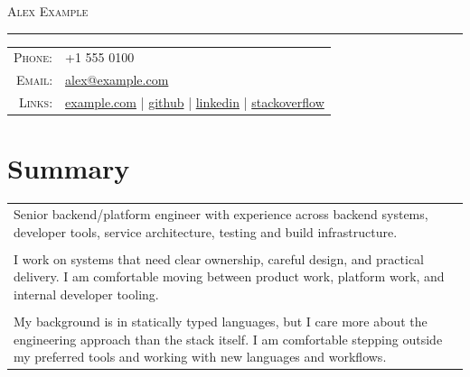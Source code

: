 \documentclass[a4paper,11pt]{article}
\begin{document}
\par{\centering
		{\Huge \textsc{Alex Example}
	}\bigskip\par}

\hrule
\vspace{0.5em}
\begin{tabular}{rl}
  \textsc{Phone:}     & +1 555 0100\\
  \textsc{Email:}     & \href{mailto:alex@example.com}{alex@example.com}\\
  \textsc{Links:}     & \faHome{} \href{https://example.com}{example.com}
                      | \faGithub{} \href{https://github.com/example}{github}
                      | \faLinkedin{} \href{https://www.linkedin.com/in/example/}{linkedin}
                      | \faStackOverflow{} \href{https://stackoverflow.com/users/000000/example}{stackoverflow}
\end{tabular}

\section{Summary}
\begin{tabular}{p{}}
 Senior backend/platform engineer with experience across backend systems, developer tools, service architecture, testing and build infrastructure.\\\\

 I work on systems that need clear ownership, careful design, and practical delivery. I am comfortable moving between product work, platform work, and internal developer tooling.\\\\

 My background is in statically typed languages, but I care more about the engineering approach than the stack itself. I am comfortable stepping outside my preferred tools and working with new languages and workflows.
\end{tabular}
\end{document}
